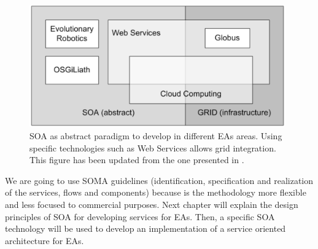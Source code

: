 \begin{figure}
\centering
\includegraphics[width=26pc]{gfx/soa/soagrid.jpg}
\caption{SOA as abstract paradigm to develop in different EAs areas. Using specific technologies such as Web Services allows grid integration. This figure has been updated from the one presented in \cite{SOALIB}.}
\label{fig:soagrid}
\end{figure}
We are going to use SOMA guidelines (identification, specification and realization of the services, flows and components) because is the methodology more flexible and less focused to commercial purposes. Next chapter will explain the design principles of SOA for developing services for EAs. Then, a specific SOA technology will be used to develop an implementation of a service oriented architecture for EAs.